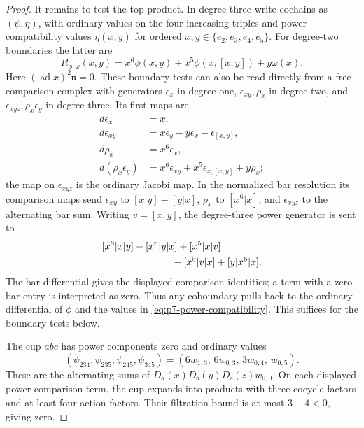 \documentclass[11pt,reqno]{amsart}
\theoremstyle{definition}
\theoremstyle{remark}
\theoremstyle{definition}
\begin{document}
\begin{proof}
It remains to test the top product. In degree three write cochains
as $(\psi,\eta)$, with ordinary values on the four increasing
triples and power-compatibility values $\eta(x,y)$ for ordered
$x,y\in\{e_2,e_3,e_4,e_5\}$. For degree-two boundaries the latter are
\begin{equation}\label{eq:p7-power-compatibility}
 R_{\phi,\omega}(x,y)=
 x^6\phi(x,y)+x^5\phi(x,[x,y])+y\omega(x).
\end{equation}
Here $(\operatorname{ad}x)^2\mathfrak n=0$.
These boundary tests can also be read directly from a free comparison
complex with generators $\epsilon_x$ in degree one,
$\epsilon_{xy},\rho_x$ in degree two, and
$\epsilon_{xyz},\rho_x\epsilon_y$ in degree three. Its first maps are
\[
\begin{aligned}
 d\epsilon_x&=x,\\
 d\epsilon_{xy}&=x\epsilon_y-y\epsilon_x-\epsilon_{[x,y]},\\
 d\rho_x&=x^6\epsilon_x,\\
 d(\rho_x\epsilon_y)&=
 x^6\epsilon_{xy}+x^5\epsilon_{x,[x,y]}+y\rho_x;
\end{aligned}
\]
the map on $\epsilon_{xyz}$ is the ordinary Jacobi map.
In the normalized bar resolution its comparison maps send
$\epsilon_{xy}$ to $[x|y]-[y|x]$, $\rho_x$ to $[x^6|x]$,
and $\epsilon_{xyz}$ to the alternating bar sum.
Writing $v=[x,y]$, the degree-three power generator is sent to
\[
\begin{aligned}
 &[x^6|x|y]-[x^6|y|x]+[x^5|x|v]\\
 &\hspace{25mm}-[x^5|v|x]+[y|x^6|x].
\end{aligned}
\]
The bar differential gives the displayed comparison identities;
a term with a zero bar entry is interpreted as zero.
Thus any coboundary pulls back to the ordinary differential of
$\phi$ and the values in \eqref{eq:p7-power-compatibility}.
This suffices for the boundary tests below.

The cup $abc$ has power components zero and ordinary values
\[
 (\psi_{234},\psi_{235},\psi_{245},\psi_{345})
 =(6w_{1,3},\,6w_{0,3},\,3w_{0,4},\,w_{0,5}).
\]
These are the alternating sums of
$D_a(x)D_b(y)D_c(z)w_{0,0}$.
On each displayed power-comparison term, the cup expands into
products with three cocycle factors and at least four action factors.
Their filtration bound is at most $3-4<0$, giving zero.


\end{proof}
\end{document}
